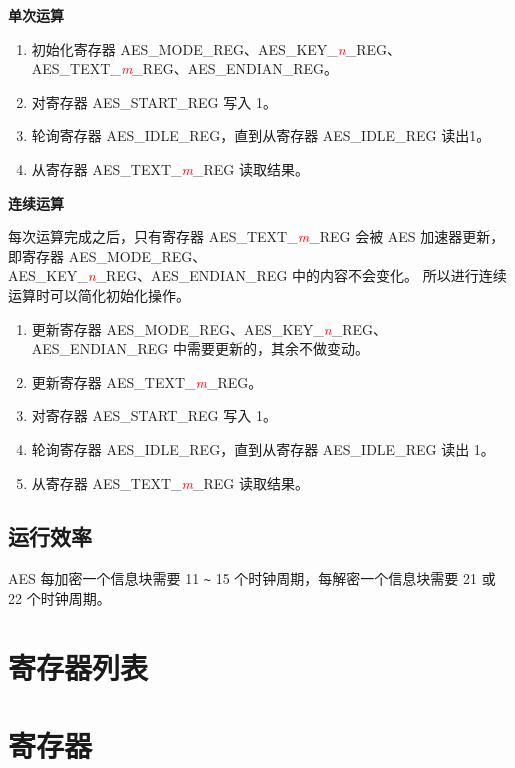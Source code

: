 \documentclass[main\_\_CN.tex]{subfiles}
\begin{document}
\textbf{单次运算}

\begin{enumerate}
    \item 初始化寄存器 AES\_MODE\_REG、AES\_KEY\_\textcolor{red}{\it{n}}\_REG、AES\_TEXT\_\textcolor{red}{\it{m}}\_REG、AES\_ENDIAN\_REG。
    \item 对寄存器 AES\_START\_REG 写入 1。
    \item 轮询寄存器 AES\_IDLE\_REG，直到从寄存器 AES\_IDLE\_REG 读出1。
    \item 从寄存器 AES\_TEXT\_\textcolor{red}{\it{m}}\_REG 读取结果。
\end{enumerate}

\textbf{连续运算}

每次运算完成之后，只有寄存器 AES\_TEXT\_\textcolor{red}{\it{m}}\_REG 会被 AES 加速器更新，
即寄存器 AES\_MODE\_REG、\\AES\_KEY\_\textcolor{red}{\it{n}}\_REG、AES\_ENDIAN\_REG 中的内容不会变化。
所以进行连续运算时可以简化初始化操作。

\begin{enumerate}
    \item 更新寄存器 AES\_MODE\_REG、AES\_KEY\_\textcolor{red}{\it{n}}\_REG、AES\_ENDIAN\_REG 中需要更新的，其余不做变动。
    \item 更新寄存器 AES\_TEXT\_\textcolor{red}{\it{m}}\_REG。
    \item 对寄存器 AES\_START\_REG 写入 1。
    \item 轮询寄存器 AES\_IDLE\_REG，直到从寄存器 AES\_IDLE\_REG 读出 1。
    \item 从寄存器 AES\_TEXT\_\textcolor{red}{\it{m}}\_REG 读取结果。
\end{enumerate}

\subsection{运行效率}
AES 每加密一个信息块需要 11 \verb+~+ 15 个时钟周期，每解密一个信息块需要 21 或 22 个时钟周期。

\hypertarget{aes-reg-summ}{}
\section{寄存器列表}\label{sec:aes-reg-summ}



\section{寄存器}

\end{document}
